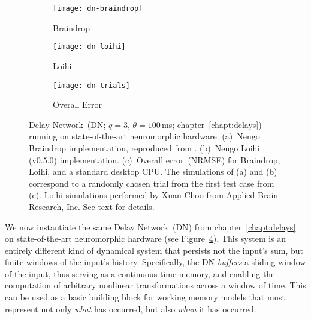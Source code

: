 \begin{figure}
  \centering
  \begin{subfigure}{.5\textwidth}
    \centering
    \texttt{[image: dn-braindrop]}
    \caption{Braindrop}
    \label{fig:dn-braindrop}
  \end{subfigure}%
  \begin{subfigure}{.5\textwidth}
    \centering
    \texttt{[image: dn-loihi]}
    \caption{Loihi}
    \label{fig:dn-loihi}
  \end{subfigure}
  \begin{subfigure}{\textwidth}
    \centering
    \vspace{2em}
    \texttt{[image: dn-trials]}
    \caption{Overall Error}
    \label{fig:dn-trials}
  \end{subfigure}
  \caption[Dynamical memory on Braindrop and Loihi.]{ \label{fig:dn-neuromorphic}
    Delay Network~(DN; $q=3$, $\theta=100$\,ms; chapter~\ref{chapt:delays}) running on state-of-the-art neuromorphic hardware.
    (a)~Nengo Braindrop implementation, reproduced from \citet[][Figure~16]{braindrop2019}. 
    (b)~Nengo Loihi (v0.5.0) implementation.
    (c)~Overall error~(NRMSE) for Braindrop, Loihi, and a standard desktop CPU.
    The simulations of (a) and (b) correspond to a randomly chosen trial from the first test case from (c).
    Loihi simulations performed by Xuan Choo from Applied Brain Research, Inc.
    See text for details.
  }
\end{figure}

We now instantiate the same Delay Network~(DN) from chapter~\ref{chapt:delays} on state-of-the-art neuromorphic hardware (see Figure~\ref{fig:dn-neuromorphic}).
This system is an entirely different kind of dynamical system that persists not the input's sum, but finite windows of the input's history.
Specifically, the DN \emph{buffers} a sliding window of the input, thus serving as a continuous-time memory, and enabling the computation of arbitrary nonlinear transformations across a window of time.
This can be used as a basic building block for working memory models that must represent not only \emph{what} has occurred, but also \emph{when} it has occurred.

